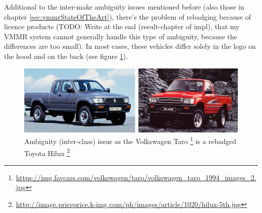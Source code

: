 Additional to the inter-make ambiguity issues mentioned before (also those in chapter \ref{sec:vmmrStateOfTheArt}), there's the problem of rebadging because of licence products (TODO: Write at the end (result-chapter of impl), that my VMMR system cannot generally handle this type of ambiguity, because the differences are too small). In most cases, these vehicles differ solely in the logo on the hood and on the back (see figure \ref{fig:ambiguityRebadging}).

\begin{figure}[bth]
  \centering
        \includegraphics[width=.75\linewidth]{gfx/ambiguity_rebadging}
        \caption{Ambiguity (inter-class) issue as the Volkswagen Taro \footnote{\url{https://img.favcars.com/volkswagen/taro/volkswagen_taro_1994_images_2.jpg}} is a rebadged Toyota Hilux \footnote{\url{http://image.priceprice.k-img.com/ph/images/article/1020/hilux-5th.jpg}}}
        \label{fig:ambiguityRebadging}
\end{figure}

